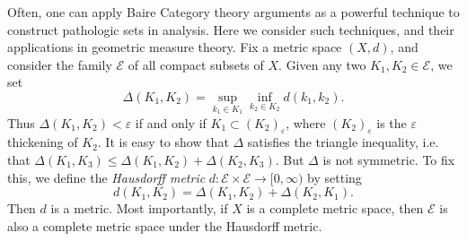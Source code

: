 Often, one can apply Baire Category theory arguments as a powerful technique to construct pathologic sets in analysis. Here we consider such techniques, and their applications in geometric measure theory. Fix a metric space $(X,d)$, and consider the family $\mathcal{E}$ of all compact subsets of $X$. Given any two $K_1,K_2 \in \mathcal{E}$, we set
%
\[ \Delta(K_1,K_2) = \sup_{k_1 \in K_1} \inf_{k_2 \in K_2} d(k_1,k_2). \]
%
Thus $\Delta(K_1,K_2) < \varepsilon$ if and only if $K_1 \subset (K_2)_\varepsilon$, where $(K_2)_\varepsilon$ is the $\varepsilon$ thickening of $K_2$. It is easy to show that $\Delta$ satisfies the triangle inequality, i.e. that $\Delta(K_1,K_3) \leq \Delta(K_1,K_2) + \Delta(K_2,K_3)$. But $\Delta$ is not symmetric. To fix this, we define the \emph{Hausdorff metric} $d: \mathcal{E} \times \mathcal{E} \to [0,\infty)$ by setting
%
\[ d(K_1,K_2) = \Delta(K_1,K_2) + \Delta(K_2,K_1). \]
%
Then $d$ is a metric. Most importantly, if $X$ is a complete metric space, then $\mathcal{E}$ is also a complete metric space under the Hausdorff metric.







